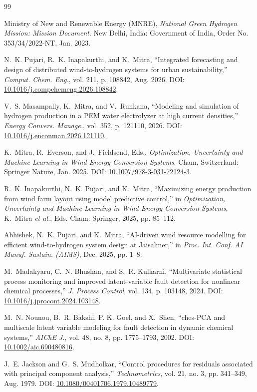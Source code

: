 \documentclass[conference]{IEEEtran}
\begin{document}
\begin{thebibliography}{99}

Ministry of New and Renewable Energy (MNRE), \emph{National Green Hydrogen Mission: Mission Document}. New Delhi, India: Government of India, Order No. 353/34/2022-NT, Jan. 2023.

N.~K. Pujari, R.~K. Inapakurthi, and K.~Mitra, ``Integrated forecasting and design of distributed wind-to-hydrogen systems for urban sustainability,'' \emph{Comput. Chem. Eng.}, vol. 211, p. 108842, Aug. 2026. DOI: \url{10.1016/j.compchemeng.2026.108842}.

V.~S. Masampally, K.~Mitra, and V.~Runkana, ``Modeling and simulation of hydrogen production in a PEM water electrolyzer at high current densities,'' \emph{Energy Convers. Manage.}, vol. 352, p. 121110, 2026. DOI: \url{10.1016/j.enconman.2026.121110}.

K.~Mitra, R.~Everson, and J.~Fieldsend, Eds., \emph{Optimization, Uncertainty and Machine Learning in Wind Energy Conversion Systems}. Cham, Switzerland: Springer Nature, Jan. 2025. DOI: \url{10.1007/978-3-031-72124-3}.

R.~K. Inapakurthi, N.~K. Pujari, and K.~Mitra, ``Maximizing energy production from wind farm layout using model predictive control,'' in \emph{Optimization, Uncertainty and Machine Learning in Wind Energy Conversion Systems}, K.~Mitra \emph{et al.}, Eds. Cham: Springer, 2025, pp. 85--112.

Abhishek, N.~K. Pujari, and K.~Mitra, ``AI-driven wind resource modelling for efficient wind-to-hydrogen system design at Jaisalmer,'' in \emph{Proc. Int. Conf. AI Manuf. Sustain. (AIMS)}, Dec. 2025, pp. 1--8.

M.~Madakyaru, C.~N. Bhushan, and S.~R. Kulkarni, ``Multivariate statistical process monitoring and improved latent-variable fault detection for nonlinear chemical processes,'' \emph{J. Process Control}, vol. 134, p. 103148, 2024. DOI: \url{10.1016/j.jprocont.2024.103148}.

M.~N. Nounou, B.~R. Bakshi, P. K. Goel, and X.~Shen, ``ches-PCA and multiscale latent variable modeling for fault detection in dynamic chemical systems,'' \emph{AIChE J.}, vol. 48, no. 8, pp. 1775--1793, 2002. DOI: \url{10.1002/aic.690480816}.

J.~E. Jackson and G.~S. Mudholkar, ``Control procedures for residuals associated with principal component analysis,'' \emph{Technometrics}, vol. 21, no. 3, pp. 341--349, Aug. 1979. DOI: \url{10.1080/00401706.1979.10489779}.


\end{thebibliography}
\end{document}
